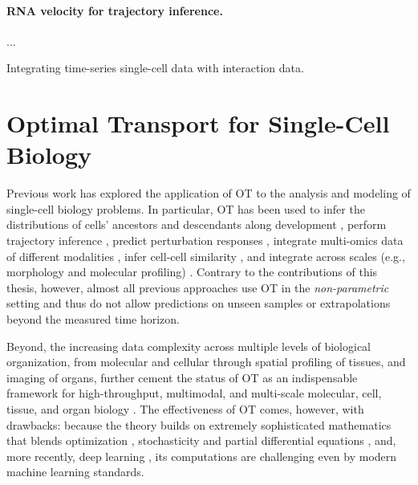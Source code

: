 \paragraph{RNA velocity for trajectory inference.}
...

Integrating time-series single-cell data with interaction data. 

\section{Optimal Transport for Single-Cell Biology}
\label{sec:ot_for_biology}

Previous work has explored the application of \acrlong{OT} to the analysis and modeling of single-cell biology problems.
In particular, \acrshort{OT} has been used to infer the distributions of cells' ancestors and descendants along development \citep{schiebinger2019optimal}, perform trajectory inference \citep{bunne2022proximal, forrow2021lineageot, bunne2022recovering, lavenant2021towards, schiebinger2019optimal, tong2020trajectorynet, yang2020predicting, zhang2021optimal, chizat2022trajectory}, predict perturbation responses \citep{bunne2021learning, yang2018scalable, lubeck2022neural}, integrate multi-omics data of different modalities \citep{demetci2022scot}, infer cell-cell similarity \citep{huizing2022optimal}, and integrate across scales (e.g., morphology and molecular profiling) \citep{yang2021multi}. 
Contrary to the contributions of this thesis, however, almost all previous approaches use \acrshort{OT} in the \emph{non-parametric} setting and thus do not allow predictions on unseen samples or extrapolations beyond the measured time horizon.

Beyond, the increasing data complexity across multiple levels of biological organization, from molecular and cellular through spatial profiling of tissues, and imaging of organs, further cement the status of OT as an indispensable framework for high-throughput, multimodal, and multi-scale molecular, cell, tissue, and organ biology \citep{moriel2021novosparc}. The effectiveness of OT comes, however, with drawbacks: because the theory builds on extremely sophisticated mathematics that blends optimization \citep{cuturi2013sinkhorn, cuturi2022optimal}, stochasticity \citep{chizat2022trajectory, bunne2022recovering} and partial differential equations \citep{bunne2022proximal}, and, more recently, deep learning \citep{tong2020trajectorynet, bunne2021learning, bunne2022supervised, yang2018scalable, lubeck2022neural, yang2021multi}, its computations are challenging even by modern machine learning standards.